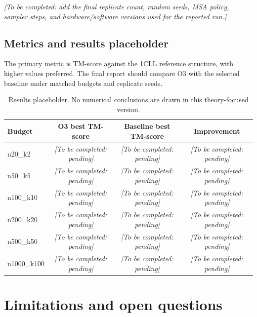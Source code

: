 \documentclass[11pt]{article}
\newcommand{\TODO}[1]{\textit{[To be completed: #1]}}
\begin{document}
\TODO{add the final replicate count, random seeds, MSA policy, sampler steps,
and hardware/software versions used for the reported run.}

\subsection{Metrics and results placeholder}

The primary metric is TM-score against the 1CLL reference structure, with
higher values preferred.  The final report should compare O3 with the selected
baseline under matched budgets and replicate seeds.

\begin{table}[ht]
    \centering
    \caption{Results placeholder.  No numerical conclusions are drawn in this
    theory-focused version.}
    \label{tab:results-placeholder}
    \begin{tabular}{@{}lccc@{}}
        \toprule
        Budget & O3 best TM-score & Baseline best TM-score & Improvement \\
        \midrule
        n20\_k2     & \TODO{pending} & \TODO{pending} & \TODO{pending} \\
        n50\_k5     & \TODO{pending} & \TODO{pending} & \TODO{pending} \\
        n100\_k10   & \TODO{pending} & \TODO{pending} & \TODO{pending} \\
        n200\_k20   & \TODO{pending} & \TODO{pending} & \TODO{pending} \\
        n500\_k50   & \TODO{pending} & \TODO{pending} & \TODO{pending} \\
        n1000\_k100 & \TODO{pending} & \TODO{pending} & \TODO{pending} \\
        \bottomrule
    \end{tabular}
\end{table}

\section{Limitations and open questions}
\label{sec:limitations}
\end{document}
